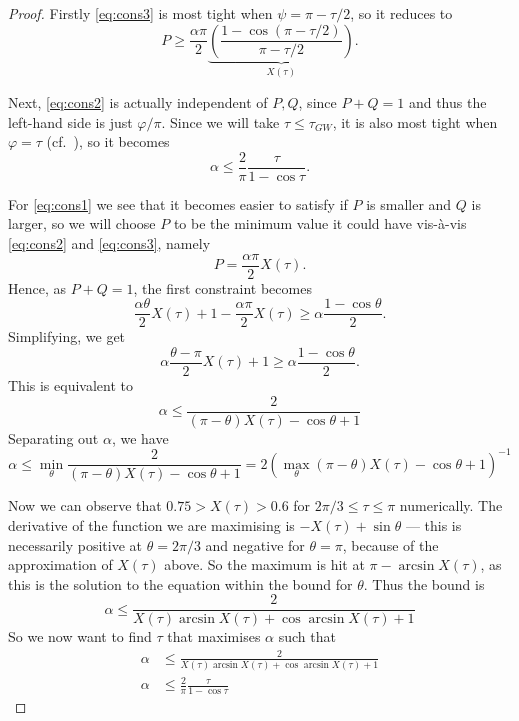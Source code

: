 \documentclass[a4paper,11pt, DIV=11]{scrartcl}
\renewcommand{\phi}{\varphi}
\theoremstyle{plain}
\theoremstyle{definition}
\begin{document}
\begin{proof}
    Firstly \eqref{eq:cons3} is most tight when $\psi = \pi - \tau/2$, so it reduces to
    \[
    P\geq \frac{\alpha\pi}{2} \underbrace{\left(\frac{1 - \cos (\pi - \tau/2)}{\pi - \tau/2} \right)}_{X(\tau)}.
    \]

    Next, \eqref{eq:cons2} is actually independent of $P, Q$, since $P + Q = 1$ and thus the left-hand side is just $\phi / \pi$. Since we will take $\tau \leq \tau_{GW}$, it is also most tight when $\phi = \tau$ (cf.~), so it becomes
    \[
    \alpha \leq \frac{2}{\pi} \frac{\tau}{1 - \cos \tau}.
    \]

    For \eqref{eq:cons1} we see that it becomes easier to satisfy if $P$ is smaller and $Q$ is larger, so we will choose $P$ to be the minimum value it could have vis-à-vis \eqref{eq:cons2} and \eqref{eq:cons3}, namely
    \[
    P = \frac{\alpha \pi}{2} X(\tau).
    \]
    Hence, as $P + Q = 1$, the first constraint becomes
    \[\frac{\alpha\theta}{2}  X(\tau)
     + 1 -  \frac{\alpha\pi}{2} X(\tau)
    \geq \alpha \frac{1 - \cos \theta}{2}.
    \]
    Simplifying, we get
    \[\alpha \frac{\theta - \pi }{2}X(\tau)
     + 1 
      \geq \alpha \frac{1 - \cos \theta}{2}.
    \]
    This is equivalent to
    \[
    \alpha \leq \frac{2}{(\pi - \theta) X(\tau) - \cos \theta + 1}
    \]
    Separating out $\alpha$, we have
    \[
    \alpha \leq \min_{\theta} \frac{2}{(\pi - \theta) X(\tau) - \cos \theta + 1}
    =
    2 \left(\max_{\theta}(\pi - \theta) X(\tau) - \cos \theta + 1 \right)^{-1}
    \]

    Now we can observe that $0.75 > X(\tau) > 0.6$ for $2\pi / 3 \leq \tau \leq \pi$ numerically. The derivative of the function we are maximising is $- X(\tau) + \sin \theta$ --- this is necessarily positive at $\theta = 2 \pi / 3$ and negative for $\theta = \pi$, because of the approximation of $X(\tau)$ above. So the maximum is hit at $\pi - \arcsin X(\tau)$, as this is the solution to the equation within the bound for $\theta$. Thus the bound is
    \[
    \alpha \leq \frac{2}{X(\tau) \arcsin X(\tau)  + \cos \arcsin X(\tau) + 1}
    \]
So we now want to find $\tau$ that maximises $\alpha$ such that
    \begin{align}
    \alpha & \leq \frac{2}{X(\tau) \arcsin X(\tau)  + \cos \arcsin X(\tau) + 1} \label{eq:bound1}\\
    \alpha & \leq \frac{2}{\pi} \frac{\tau}{1 - \cos \tau}\label{eq:bound2}
    \end{align}


\end{proof}
\end{document}
